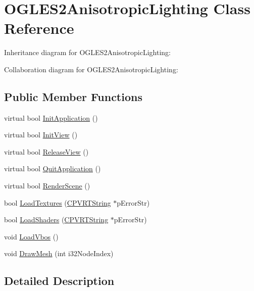\hypertarget{class_o_g_l_e_s2_anisotropic_lighting}{\section{O\+G\+L\+E\+S2\+Anisotropic\+Lighting Class Reference}
\label{class_o_g_l_e_s2_anisotropic_lighting}
}


Inheritance diagram for O\+G\+L\+E\+S2\+Anisotropic\+Lighting\+:


Collaboration diagram for O\+G\+L\+E\+S2\+Anisotropic\+Lighting\+:
\subsection*{Public Member Functions}
\begin{DoxyCompactItemize}
\item 
virtual bool \hyperlink{class_o_g_l_e_s2_anisotropic_lighting_a23db753a4fa33bc0dc4af64a29dab3d7}{Init\+Application} ()
\item 
virtual bool \hyperlink{class_o_g_l_e_s2_anisotropic_lighting_a6e5c65cd35c6a2fb74f1a04b68ecccf0}{Init\+View} ()
\item 
virtual bool \hyperlink{class_o_g_l_e_s2_anisotropic_lighting_ab971ed8f0191cbb67f2c813e91ded2db}{Release\+View} ()
\item 
virtual bool \hyperlink{class_o_g_l_e_s2_anisotropic_lighting_aa22804478db9b456406dd77c05f7beaf}{Quit\+Application} ()
\item 
virtual bool \hyperlink{class_o_g_l_e_s2_anisotropic_lighting_aca930a4b45c60b08e6f02acf0ed4436d}{Render\+Scene} ()
\item 
bool \hyperlink{class_o_g_l_e_s2_anisotropic_lighting_a6200ba49e1dd5b43405b85c7770fad0d}{Load\+Textures} (\hyperlink{class_c_p_v_r_t_string}{C\+P\+V\+R\+T\+String} $\ast$p\+Error\+Str)
\item 
bool \hyperlink{class_o_g_l_e_s2_anisotropic_lighting_a99bb8c97259c0115d1c90f5f4f1c9b63}{Load\+Shaders} (\hyperlink{class_c_p_v_r_t_string}{C\+P\+V\+R\+T\+String} $\ast$p\+Error\+Str)
\item 
void \hyperlink{class_o_g_l_e_s2_anisotropic_lighting_a6bd6beb8ed58b4f7cc32d6c3f69f8c3b}{Load\+Vbos} ()
\item 
void \hyperlink{class_o_g_l_e_s2_anisotropic_lighting_a91ef3b2aaedb14692573516830eb26c1}{Draw\+Mesh} (int i32\+Node\+Index)
\end{DoxyCompactItemize}


\subsection{Detailed Description}


